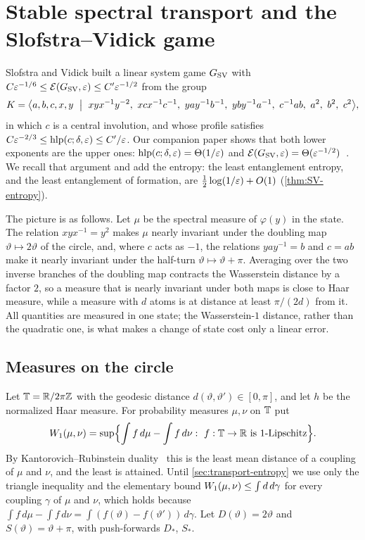 \section{Stable spectral transport and the Slofstra--Vidick game}\label{sec:transport}

Slofstra and Vidick built a linear system game $G_{\mathrm{SV}}$ with $C\varepsilon^{-1/6}\le\mathcal E(G_{\mathrm{SV}},\varepsilon)\le C'\varepsilon^{-1/2}$ from the
group~\cite[Proposition~3.2]{SV18}
\begin{equation}\label{eq:K}
K=\bigl\langle a,b,c,x,y\ \bigm|\ xyx^{-1}y^{-2},\ xcx^{-1}c^{-1},\ yay^{-1}b^{-1},\ yby^{-1}a^{-1},\ c^{-1}ab,\ a^2,\ b^2,\ c^2\bigr\rangle ,
\end{equation}
in which $c$ is a central involution, and whose profile satisfies $C\varepsilon^{-2/3}\le\operatorname{hlp}(c;\delta,\varepsilon)\le C'/\varepsilon$. Our
companion paper shows that both lower exponents are the upper ones: $\operatorname{hlp}(c;\delta,\varepsilon)=\Theta(1/\varepsilon)$ and
$\mathcal E(G_{\mathrm{SV}},\varepsilon)=\Theta(\varepsilon^{-1/2})$~\cite[Theorem~F]{DM-game}. We recall that argument and add the entropy: the least
entanglement entropy, and the least entanglement of formation, are $\frac12\log(1/\varepsilon)+O(1)$ (\cref{thm:SV-entropy}).

The picture is as follows. Let $\mu$ be the spectral measure of $\varphi(y)$ in the state. The relation $xyx^{-1}=y^2$
makes $\mu$ nearly invariant under the doubling map $\vartheta\mapsto2\vartheta$ of the circle, and, where $c$ acts as
$-1$, the relations $yay^{-1}=b$ and $c=ab$ make it nearly invariant under the half-turn $\vartheta\mapsto\vartheta+\pi$.
Averaging over the two inverse branches of the doubling map contracts the Wasserstein distance by a factor $2$, so a
measure that is nearly invariant under both maps is close to Haar measure, while a measure with $d$ atoms is at distance
at least $\pi/(2d)$ from it. All quantities are measured in one state; the Wasserstein-$1$ distance, rather than the
quadratic one, is what makes a change of state cost only a linear error.

\subsection{Measures on the circle}\label{sec:transport-circle}

Let $\mathbb T=\mathbb R/2\pi\mathbb Z$ with the geodesic distance $d(\vartheta,\vartheta')\in[0,\pi]$, and let $h$ be the normalized Haar
measure. For probability measures $\mu,\nu$ on $\mathbb T$ put
\[
W_1(\mu,\nu)=\sup\Bigl\{\int f\,d\mu-\int f\,d\nu:\ f:\mathbb T\to\mathbb R\text{ is }1\text{-Lipschitz}\Bigr\}.
\]
By Kantorovich--Rubinstein duality~\cite[Chapter~5]{Vil09} this is the least mean distance of a coupling of $\mu$ and
$\nu$, and the least is attained. Until \cref{sec:transport-entropy} we use only the triangle inequality and the
elementary bound $W_1(\mu,\nu)\le\int d\,d\gamma$ for every coupling $\gamma$ of $\mu$ and $\nu$, which holds because
$\int f\,d\mu-\int f\,d\nu=\int(f(\vartheta)-f(\vartheta'))\,d\gamma$. Let $D(\vartheta)=2\vartheta$
and $S(\vartheta)=\vartheta+\pi$, with push-forwards $D_*$, $S_*$.

